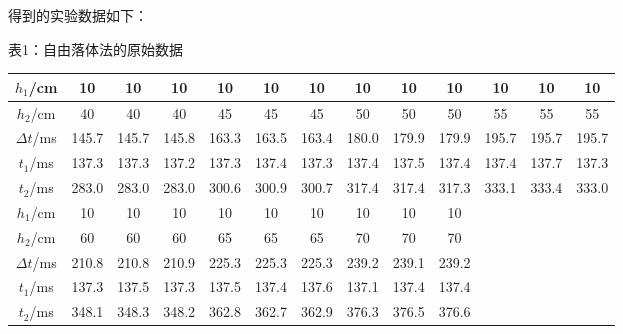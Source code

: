 \documentclass[11pt]{article}
\begin{document}
得到的实验数据如下：
\begin{center}
	表1：自由落体法的原始数据
			\begin{tabular}{|c|c|c|c|c|c|c|c|c|c|ccc}
			\hline
			$ h_1 $/cm & 10    & 10    & 10    & 10    & 10    & 10    & 10    & 10    & 10    & \multicolumn{1}{c|}{10}    & \multicolumn{1}{c|}{10}    & \multicolumn{1}{c|}{10}    \\ \hline
			$ h_2 $/cm & 40    & 40    & 40    & 45    & 45    & 45    & 50    & 50    & 50    & \multicolumn{1}{c|}{55}    & \multicolumn{1}{c|}{55}    & \multicolumn{1}{c|}{55}    \\ \hline
			$ \Delta t $/ms   & 145.7 & 145.7 & 145.8 & 163.3 & 163.5 & 163.4 & 180.0   & 179.9 & 179.9 & \multicolumn{1}{c|}{195.7} & \multicolumn{1}{c|}{195.7} & \multicolumn{1}{c|}{195.7} \\ \hline
			$ t_1 $/ms   & 137.3 & 137.3 & 137.2 & 137.3 & 137.4 & 137.3 & 137.4 & 137.5 & 137.4 & \multicolumn{1}{c|}{137.4} & \multicolumn{1}{c|}{137.7} & \multicolumn{1}{c|}{137.3} \\ \hline
			$ t_2 $/ms   & 283.0 & 283.0 & 283.0 & 300.6 & 300.9 & 300.7 & 317.4 & 317.4 & 317.3 & \multicolumn{1}{c|}{333.1} & \multicolumn{1}{c|}{333.4} & \multicolumn{1}{c|}{333.0} \\ \hline
			$ h_1 $/cm & 10    & 10    & 10    & 10    & 10    & 10    & 10    & 10    & 10    &                            &                            &                            \\ \cline{1-10}
			$ h_2 $/cm & 60    & 60    & 60    & 65    & 65    & 65    & 70    & 70    & 70    &                            &                            &                            \\ \cline{1-10}
			$ \Delta t $/ms    & 210.8 & 210.8 & 210.9 & 225.3 & 225.3 & 225.3 & 239.2 & 239.1 & 239.2 &                            &                            &                            \\ \cline{1-10}
			$ t_1 $/ms & 137.3 & 137.5 & 137.3 & 137.5 & 137.4 & 137.6 & 137.1 & 137.4 & 137.4 &                            &                            &                            \\ \cline{1-10}
			$ t_2 $/ms & 348.1 & 348.3 & 348.2 & 362.8 & 362.7 & 362.9 & 376.3 & 376.5 & 376.6 &                            &                            &                            \\ \cline{1-10}
		\end{tabular}
\end{center}
\end{document}
